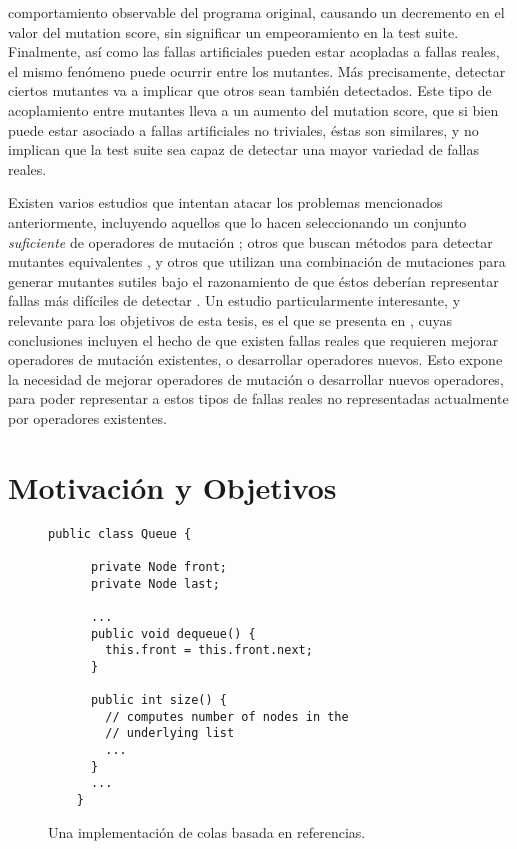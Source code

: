comportamiento observable del programa original, causando un decremento en el valor del mutation score, sin significar un empeoramiento en la test suite. Finalmente, as\'i como las fallas artificiales pueden estar acopladas a fallas reales, el mismo fen\'omeno puede ocurrir entre los mutantes. M\'as precisamente, detectar ciertos mutantes va a implicar que otros sean tambi\'en detectados. Este tipo de acoplamiento entre mutantes lleva a un aumento del mutation score, que si bien puede estar asociado a fallas artificiales no triviales, \'estas son similares, y no implican que la test suite sea capaz de detectar una mayor variedad de fallas reales.

Existen varios estudios que intentan atacar los problemas mencionados anteriormente, incluyendo aquellos que lo hacen seleccionando un conjunto \emph{suficiente} de operadores de mutaci\'on \cite{bibliography.mutation.selection.Offutt96, bibliography.mutation.selection.ASN2008}; otros que buscan m\'etodos para detectar mutantes equivalentes \cite{biblography.mutation.evaluation.equivalent.Grun+09, biblography.mutation.evaluation.equivalent.Schuler+10, biblography.mutation.evaluation.equivalent.Just+13}, y otros que utilizan una combinaci\'on de mutaciones para generar mutantes sutiles bajo el razonamiento de que \'estos deber\'ian representar fallas m\'as dif\'iciles de detectar \cite{bibliography.mutation.highorder.Jia+08, bibliography.mutation.highorder.Jia+09, bibliography.mutation.highorder.Harman+11}. Un estudio particularmente interesante, y relevante para los objetivos de esta tesis, es el que se presenta en \cite{bibliography.mutation.evaluation.valid-substitute}, cuyas conclusiones incluyen el hecho de que existen fallas reales que requieren mejorar operadores de mutaci\'on existentes, o desarrollar operadores nuevos. Esto expone la necesidad de mejorar operadores de mutaci\'on o desarrollar nuevos operadores, para poder representar a estos tipos de fallas reales no representadas actualmente por operadores existentes.

\section{Motivaci\'on y Objetivos}
\label{sec:intro.objetivos}


\begin{figure}[t]
	\begin{lstlisting}[frame=tlrb, mathescape=true]
    public class Queue {
	
      private Node front;
      private Node last;
	
      ...
      public void dequeue() {
        this.front = this.front.next;
      }
	
      public int size() {
        // computes number of nodes in the 
        // underlying list
        ...
      }
      ...
    }
	\end{lstlisting}
	\caption{Una implementaci\'on de colas basada en referencias.}
	\label{figures.motivation.queue-class}
\end{figure}

